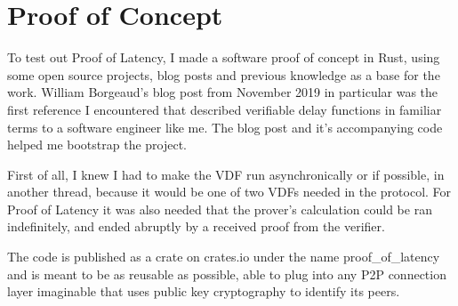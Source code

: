 \chapter{Proof of Concept}
\label{Proof of Concept}
To test out Proof of Latency, I made a software proof of concept in Rust, using some open source projects, blog posts and previous knowledge as a base for the work. William Borgeaud's blog post\cite{Borgeaud2019-wk} from November 2019 in particular was the first reference I encountered that described verifiable delay functions in familiar terms to a software engineer like me. The blog post and it's accompanying code\cite{Borgeaud2019-nn} helped me bootstrap the project.

First of all, I knew I had to make the VDF run asynchronically or if possible, in another thread, because it would be one of two VDFs needed in the protocol. For Proof of Latency it was also needed that the prover's calculation could be ran indefinitely, and ended abruptly by a received proof from the verifier.

The code is published as a crate on crates.io under the name proof\_of\_latency and is meant to be as reusable as possible, able to plug into any P2P connection layer imaginable that uses public key cryptography to identify its peers. 
